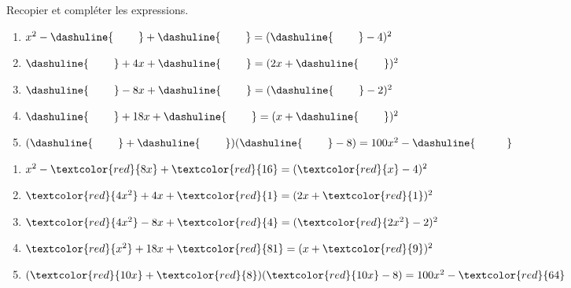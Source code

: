 \begin{exo}[type=solution]  Recopier et compléter les expressions. \label{cpl2}
	
	\begin{enumerate}[label=\bf{\alph*)\,}]		
		\item		$x^2-\dashuline{\hspace{0.8cm}}+\dashuline{\hspace{0.8cm}}=(\dashuline{\hspace{0.8cm}}-4)^2$	
		\item		$\dashuline{\hspace{0.8cm}}+4x+\dashuline{\hspace{0.8cm}}=(2x+\dashuline{\hspace{0.8cm}})^2$
		\item		$\dashuline{\hspace{0.8cm}}-8x+\dashuline{\hspace{0.8cm}}=(\dashuline{\hspace{0.8cm}}-2)^2$
		\item		$\dashuline{\hspace{0.8cm}}+18x+\dashuline{\hspace{0.8cm}}=(x+\dashuline{\hspace{0.8cm}})^2$
	\item $   (\dashuline{\hspace{.8cm}}+\dashuline{\hspace{.8cm}})(\dashuline{\hspace{.8cm}}-8)= 100x^2-\dashuline{\hspace{1cm}}$ 	
	\end{enumerate}
	
	
\begin{sol}
	\begin{enumerate}[label=\bf{\alph*)\,}]		
		\item		$x^2-\textcolor{red}{8x}+\textcolor{red}{16}=(\textcolor{red}{x}-4)^2$
		\item		$\textcolor{red}{4x^2}+4x+\textcolor{red}{1}=(2x+\textcolor{red}{1})^2$
		\item		$\textcolor{red}{4x^2}-8x+\textcolor{red}{4}=(\textcolor{red}{2x^2}-2)^2$
		\item		$\textcolor{red}{x^2}+18x+\textcolor{red}{81}=(x+\textcolor{red}{9})^2$
		\item $   (\textcolor{red}{10x}+\textcolor{red}{8})(\textcolor{red}{10x}-8)= 100x^2-\textcolor{red}{64}$ 	
	\end{enumerate}	
\end{sol}		
\end{exo}	





